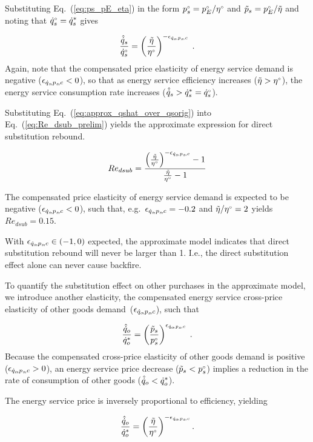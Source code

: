 Substituting Eq.~(\ref{eq:ps_pE_eta}) in the form
${}{p}^{\scriptscriptstyle \circ}_s = {}{p}^{\scriptscriptstyle \circ}_E/{}{\eta}^{\scriptscriptstyle \circ}$ and
$\tilde{p}_s = {}{p}^{\scriptscriptstyle \circ}_E/\tilde{\eta}$
and noting that ${}{\dot{q}}^{\scriptscriptstyle \circ}_s = {\dot{q}}^*_s$ gives

\begin{equation} \label{eq:approx_qshat_over_qsorig}
  \frac{\hat{\dot{q}}_s}{{}{\dot{q}}^{\scriptscriptstyle \circ}_s} = \left( \frac{\tilde{\eta}}{{}{\eta}^{\scriptscriptstyle \circ}} \right)^{-\epsilon_{\dot{q}_s\!,p_s\!,c}} \; .
\end{equation}
%
Again, note that the compensated price elasticity of energy service demand
is negative ($\epsilon_{\dot{q}_s\!,p_s\!,c} < 0$), so that
as energy service efficiency increases ($\tilde{\eta} > {}{\eta}^{\scriptscriptstyle \circ}$),
the energy service consumption rate increases ($\hat{\dot{q}}_s > {\dot{q}}^*_s = {}{\dot{q}}^{\scriptscriptstyle \circ}_s$).

Substituting Eq.~(\ref{eq:approx_qshat_over_qsorig}) into Eq.~(\ref{eq:Re_dsub_prelim})
yields the approximate expression for direct substitution rebound.

\begin{equation} \label{eq:Re_dsub_approx}
  Re_{dsub} = \frac{\left( \frac{\tilde{\eta}}{{}{\eta}^{\scriptscriptstyle \circ}} \right)^{-\epsilon_{\dot{q}_s\!,p_s\!,c}} - 1} {\frac{\tilde{\eta}}{{}{\eta}^{\scriptscriptstyle \circ}} - 1}
\end{equation}

The compensated price elasticity of energy service demand is
expected to be negative ($\epsilon_{\dot{q}_s\!,p_s\!,c} < 0$), 
such that, e.g.\
$\epsilon_{\dot{q}_s\!,p_s\!,c} = -0.2$ and $\tilde{\eta}/{}{\eta}^{\scriptscriptstyle \circ} = 2$
yields $Re_{dsub} = 0.15$.

With $\epsilon_{\dot{q}_s\!,p_s\!,c} \in (-1, 0)$ expected,
the approximate model indicates that
direct substitution rebound will never be larger than 1.
I.e., the direct substitution effect alone
can never cause backfire. 

To quantify the substitution effect on other purchases in the approximate model,
we introduce another elasticity,
the compensated energy service cross-price elasticity of other goods demand~($\epsilon_{\dot{q}_o\!,p_s\!,c}$), 
such that

\begin{equation}
  \frac{\hat{\dot{q}}_o}{{\dot{q}}^*_o} = \left( \frac{\tilde{p}_s}{{}{p}^{\scriptscriptstyle \circ}_s} \right) ^ {\epsilon_{\dot{q}_o\!,p_s\!,c}} \; .
\end{equation}
%
Because the compensated cross-price elasticity of other goods demand
is positive ($\epsilon_{\dot{q}_o\!,p_s\!,c} > 0$),
an energy service price decrease ($\tilde{p}_s < {}{p}^{\scriptscriptstyle \circ}_s$)
implies a reduction in the rate of consumption of other goods ($\hat{\dot{q}}_o < {\dot{q}}^*_o$).

The energy service price is inversely proportional to 
efficiency, yielding

\begin{equation} \label{eq:qohat_qostar}
  \frac{\hat{\dot{q}}_o}{{\dot{q}}^*_o} = \left( \frac{\tilde{\eta}}{{}{\eta}^{\scriptscriptstyle \circ}} \right) ^ {-\epsilon_{\dot{q}_o\!,p_s\!,c}} .
\end{equation}

